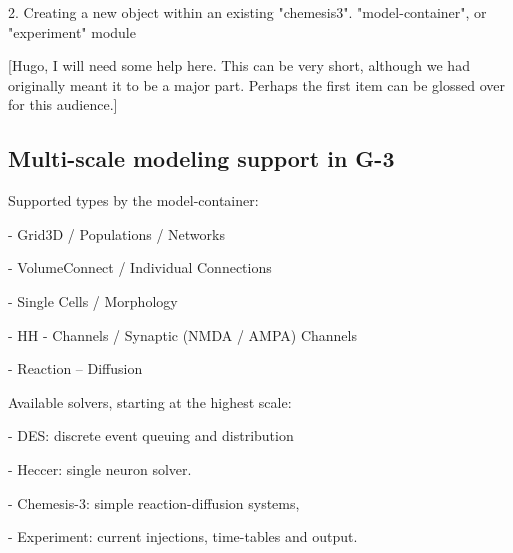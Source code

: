 \documentclass[12pt]{article}
\begin{document}
  2. Creating a new object within an existing "chemesis3".
     "model-container", or "experiment" module

  [Hugo, I will need some help here.  This can be very short, although
  we had originally meant it to be a major part.  Perhaps the first item
  can be glossed over for this audience.]

\subsection{Multi-scale modeling support in G-3}

Supported types by the model-container:

- Grid3D / Populations / Networks

- VolumeConnect / Individual Connections

- Single Cells / Morphology

- HH - Channels / Synaptic (NMDA / AMPA) Channels

- Reaction -- Diffusion


Available solvers, starting at the highest scale:

- DES: discrete event queuing and distribution

- Heccer: single neuron solver.

- Chemesis-3: simple reaction-diffusion systems,

- Experiment: current injections, time-tables and output.





\end{document}

